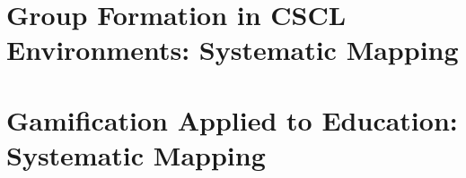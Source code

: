 \documentclass[doutorado, pre-defesa, brazil, english]{packages/icmc}
\begin{document}


\glsaddall
\printglossaries


\begin{apendicesenv}

    \chapter{Group Formation in CSCL Environments: Systematic Mapping}
    \label{chapter:gf_mapping}
    

    \chapter{Gamification Applied to Education: Systematic Mapping}
    \label{chapter:gamification_mapping}
    

\end{apendicesenv}


\begin{anexosenv}

%    

\end{anexosenv}
\end{document}
